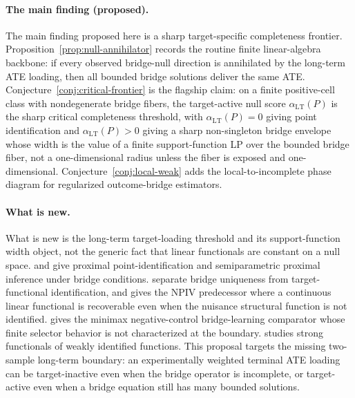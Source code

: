 \documentclass[11pt]{article}
\theoremstyle{definition}
\theoremstyle{plain}
\theoremstyle{remark}
\begin{document}
\paragraph{The main finding (proposed).}
The main finding proposed here is a sharp target-specific completeness
frontier.  Proposition~\ref{prop:null-annihilator} records the routine finite
linear-algebra backbone: if every observed bridge-null direction is annihilated
by the long-term ATE loading, then all bounded bridge solutions deliver the
same ATE.  Conjecture~\ref{conj:critical-frontier} is the flagship claim: on a
finite positive-cell class with nondegenerate bridge fibers, the target-active
null score \(\alpha_{\mathrm{LT}}(P)\) is the sharp critical completeness
threshold, with \(\alpha_{\mathrm{LT}}(P)=0\) giving point identification and
\(\alpha_{\mathrm{LT}}(P)>0\) giving a sharp non-singleton bridge envelope whose
width is the value of a finite support-function LP over the bounded bridge
fiber, not a one-dimensional radius unless the fiber is exposed and
one-dimensional.  Conjecture~\ref{conj:local-weak} adds the
local-to-incomplete phase diagram for regularized outcome-bridge estimators.

\paragraph{What is new.}
What is new is the long-term target-loading threshold and its support-function
width object, not the generic fact that linear functionals are constant on a
null space.  \citet[Sections 2--4]{MiaoGengTchetgen2018} and
\citet[Theorem 3.1 and equation (9)]{CuiPuShiMiaoTchetgen2024} give proximal
point-identification and semiparametric proximal inference under bridge
conditions.  \citet[Section 2 and Section 3]{ZhangLiMiaoTchetgen2023} separate
bridge uniqueness from target-functional identification, and
\citet[Abstract and Sections 2--3]{Santos2011JoE} gives the NPIV predecessor
where a continuous linear functional is recoverable even when the nuisance
structural function is not identified.  \citet[Abstract and Section
4]{KallusMaoUehara2021} gives the minimax negative-control bridge-learning
comparator whose finite selector behavior is not characterized at the boundary.
\citet[Abstract and Theorem 2.1]{BennettKallusMaoNeweySyrgkanisUehara2023}
studies strong functionals of weakly identified functions.  This proposal
targets the missing two-sample long-term boundary: an experimentally weighted
terminal ATE loading can be target-inactive even when the bridge operator is
incomplete, or target-active even when a bridge equation still has many bounded
solutions.
\end{document}
